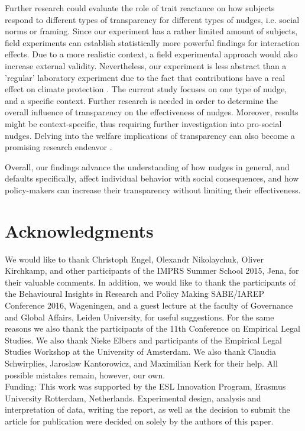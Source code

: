 \documentclass[review, authoryear,12pt]{elsarticle}
\begin{document}
Further research could evaluate the role of trait reactance on how subjects respond to different types of transparency for different types of nudges, i.e. social norms or framing. Since our experiment has a rather limited amount of subjects, field experiments can establish statistically more powerful findings for interaction effects. Due to a more realistic context, a field experimental approach would also increase external validity. Nevertheless, our experiment is less abstract than a 'regular' laboratory experiment due to the fact that contributions have a real effect on climate protection \cite{Harrison.2004}. The current study focuses on one type of nudge, and a specific context. Further research is needed in order to determine the overall influence of transparency on the effectiveness of nudges. Moreover, results might be context-specific, thus requiring further investigation into pro-social nudges. Delving into the welfare implications of transparency can also become a promising research endeavor \citep{Sunstein.2015}.

Overall, our findings advance the understanding of how nudges in general, and defaults specifically, affect individual behavior with social consequences, and how policy-makers can increase their transparency without limiting their effectiveness.


\section*{Acknowledgments}
We would like to thank Christoph Engel, Olexandr Nikolaychuk, Oliver Kirchkamp, and other participants of the IMPRS Summer School 2015, Jena, for their valuable comments. In addition, we would like to thank the participants of the Behavioural Insights in Research and Policy Making SABE/IAREP Conference 2016, Wageningen, and a guest lecture at the faculty of Governance and Global Affairs, Leiden University, for useful suggestions. For the same reasons we also thank the participants of the 11th Conference on Empirical Legal Studies. We also thank Nieke Elbers and participants of the Empirical Legal Studies Workshop at the University of Amsterdam. We also thank Claudia Schwirplies, Jaroslaw Kantorowicz, and Maximilian Kerk for their help. All possible mistakes remain, however, our own. \\
Funding: This work was supported by the ESL Innovation Program, Erasmus University Rotterdam, Netherlands. Experimental design, analysis and interpretation of data, writing the report, as well as the decision to submit the article for publication were decided on solely by the authors of this paper.
\end{document}
